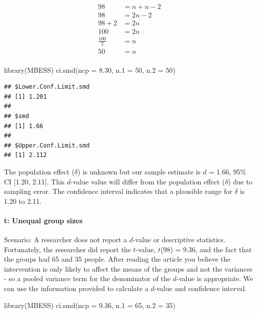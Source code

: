 \documentclass[
]{krantz}
\makeatletter
\newenvironment{Shaded}{\begin{snugshade}}{\end{snugshade}}
\newcommand{\AttributeTok}[1]{\textcolor[rgb]{0.61,0.61,0.61}{#1}}
\newcommand{\DecValTok}[1]{\textcolor[rgb]{0.06,0.06,0.06}{#1}}
\newcommand{\FloatTok}[1]{\textcolor[rgb]{0.06,0.06,0.06}{#1}}
\newcommand{\FunctionTok}[1]{\textcolor[rgb]{0,0,0}{#1}}
\newcommand{\NormalTok}[1]{#1}
\newenvironment{kframe}{%
\medskip{}
\setlength{\fboxsep}{.8em}
 \def\at@end@of@kframe{}%
 \ifinner\ifhmode%
  \def\at@end@of@kframe{\end{minipage}}%
  \begin{minipage}{\columnwidth}%
 \fi\fi%
 \def\FrameCommand##1{\hskip\@totalleftmargin \hskip-\fboxsep
 \colorbox{shadecolor}{##1}\hskip-\fboxsep
     \hskip-\linewidth \hskip-\@totalleftmargin \hskip\columnwidth}%
 \MakeFramed {\advance\hsize-\width
   \@totalleftmargin\z@ \linewidth\hsize
   \@setminipage}}%
 {\par\unskip\endMakeFramed%
 \at@end@of@kframe}
\renewenvironment{Shaded}{\begin{kframe}}{\end{kframe}}
\makeatother
\begin{document}
\[
\begin{aligned}
98 &= n + n - 2\\
98 &= 2n - 2\\
98 + 2 &= 2n \\
100 &= 2n \\
\frac{100}{2} &= n \\
50 &= n \\
\end{aligned}
\]

\begin{Shaded}
\begin{Highlighting}[]
\FunctionTok{library}\NormalTok{(MBESS)}
\FunctionTok{ci.smd}\NormalTok{(}\AttributeTok{ncp =} \FloatTok{8.30}\NormalTok{, }\AttributeTok{n.1 =} \DecValTok{50}\NormalTok{, }\AttributeTok{n.2 =} \DecValTok{50}\NormalTok{) }
\end{Highlighting}
\end{Shaded}

\begin{verbatim}
## $Lower.Conf.Limit.smd
## [1] 1.201
## 
## $smd
## [1] 1.66
## 
## $Upper.Conf.Limit.smd
## [1] 2.112
\end{verbatim}

The population effect (\(\delta\)) is unknown but our sample estimate is \(d\) = 1.66, 95\% CI {[}1.20, 2.11{]}. This \(d\)-value value will differ from the population effect (\(\delta\)) due to sampling error. The confidence interval indicates that a plausible range for \(\delta\) is 1.20 to 2.11.

\hypertarget{t-unequal-group-sizes}{%
\paragraph{t: Unequal group sizes}\label{t-unequal-group-sizes}}

Scenario: A researcher does not report a \(d\)-value or descriptive statistics. Fortunately, the researcher did report the \(t\)-value, \(t\)(98) = 9.36, and the fact that the groups had 65 and 35 people. After reading the article you believe the intervention is only likely to affect the means of the groups and not the variances - so a pooled variance term for the denominator of the \(d\)-value is appropriate. We can use the information provided to calculate a \(d\)-value and confidence interval.

\begin{Shaded}
\begin{Highlighting}[]
\FunctionTok{library}\NormalTok{(MBESS)}
\FunctionTok{ci.smd}\NormalTok{(}\AttributeTok{ncp =} \FloatTok{9.36}\NormalTok{, }\AttributeTok{n.1 =} \DecValTok{65}\NormalTok{, }\AttributeTok{n.2 =} \DecValTok{35}\NormalTok{) }
\end{Highlighting}
\end{Shaded}
\end{document}
